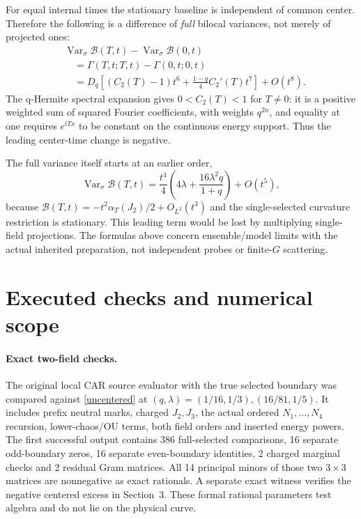 \documentclass[11pt]{article}
\begin{document}
For equal internal times the stationary baseline is independent
of common center. Therefore the following is a difference of
\emph{full} bilocal variances, not merely of projected ones:
\begin{align}\label{difference}
 &\operatorname{Var}_{\sigma}\mathcal B(T,t)
       -\operatorname{Var}_{\sigma}\mathcal B(0,t)\nonumber\\
 &\quad=\Gamma(T,t;T,t)-\Gamma(0,t;0,t)\nonumber\\
 &\quad=D_q\left[(C_2(T)-1)t^6+
                 \frac{1-q}{4}C_2'(T)t^7\right]+O(t^8).
\end{align}
The q-Hermite spectral expansion gives $0<C_2(T)<1$ for
$T\ne0$: it is a positive weighted sum of squared Fourier
coefficients, with weights $q^{2n}$, and equality at one requires
$e^{iTx}$ to be constant on the continuous energy support.
Thus the leading center-time change is negative.

The full variance itself starts at an earlier order,
\[
 \operatorname{Var}_{\sigma}\mathcal B(T,t)
 =\frac{t^4}{4}\left(4\lambda+
                   \frac{16\lambda^2q}{1+q}\right)+O(t^5),
\]
because $\mathcal B(T,t)=-t^2\alpha_T(J_2)/2+O_{L^2}(t^3)$
and the single-selected curvature restriction is stationary.
This leading term would be lost by multiplying single-field
projections. The formulas above concern ensemble/model limits
with the actual inherited preparation, not independent probes
or finite-$G$ scattering.

\newpage
\section{Executed checks and numerical scope}
\paragraph{Exact two-field checks.}
The original local CAR source evaluator with the true selected
boundary was compared against \eqref{uncentered} at
$(q,\lambda)=(1/16,1/3),(16/81,1/5)$.
It includes prefix neutral marks, charged $J_2,J_3$, the actual
ordered $N_1,\ldots,N_4$ recursion, lower-chaos/OU terms, both
field orders and inserted energy powers. The first successful
output contains 386 full-selected comparisons, 16 separate
odd-boundary zeros, 16 separate even-boundary identities,
2 charged marginal checks and 2 residual Gram matrices. All 14
principal minors of those two $3\times3$ matrices are nonnegative
as exact rationals. A separate exact witness verifies the
negative centered excess in Section~3. These formal rational
parameters test algebra and do not lie on the physical curve.
\end{document}
